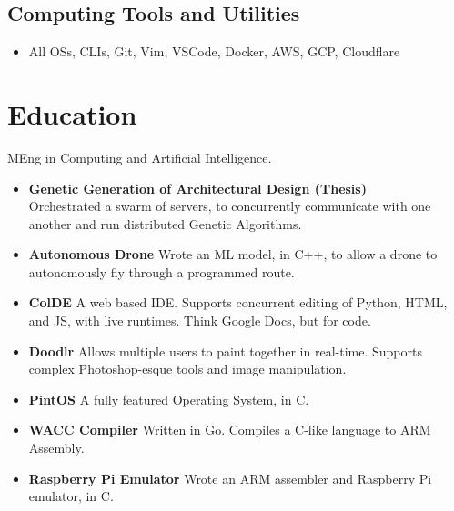 \documentclass{jcgcv}
\begin{document}
\begin{column}
  \subsection{Computing Tools and Utilities}
  \begin{itemize}
    \item All OSs, CLIs, Git, Vim, VSCode, Docker, AWS, GCP, Cloudflare
  \end{itemize}

  \section{Education}
  MEng in Computing and Artificial Intelligence.
  \begin{itemize}
    \item \textbf{Genetic Generation of Architectural Design (Thesis)} \\
          Orchestrated a swarm of servers, to concurrently communicate with
          one another and run distributed Genetic Algorithms.
    \item \textbf{Autonomous Drone} Wrote an ML model, in C++, to allow a drone
          to autonomously fly through a programmed route.
    \item \textbf{ColDE} A web based IDE. Supports concurrent editing of Python,
          HTML, and JS, with live runtimes. Think Google Docs, but for code.
    \item \textbf{Doodlr} Allows multiple users to paint together in real-time. Supports
          complex Photoshop-esque tools and image manipulation.
    \item \textbf{PintOS} A fully featured Operating System, in C.
    \item \textbf{WACC Compiler} Written in Go. Compiles a C-like language to ARM
          Assembly.
    \item \textbf{Raspberry Pi Emulator} Wrote an ARM assembler and Raspberry
          Pi emulator, in C.
  \end{itemize}


\end{column}
\end{document}
